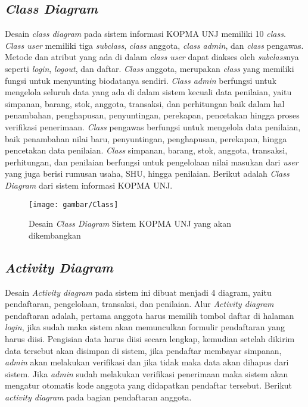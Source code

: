 \subsection{\emph{Class Diagram}}
Desain \emph{class diagram} pada sistem informasi KOPMA UNJ memiliki 10 \emph{class}. \emph{Class user} memiliki tiga \emph{subclass}, \emph{class} anggota, \emph{class admin}, dan \emph{class} pengawas. Metode dan atribut yang ada di dalam \emph{class user} dapat diakses oleh \emph{subclass}nya seperti \emph{login}, \emph{logout}, dan daftar. \emph{Class} anggota, merupakan \emph{class} yang memiliki fungsi untuk menyunting biodatanya sendiri. \emph{Class admin} berfungsi untuk mengelola seluruh data yang ada di dalam sistem kecuali data penilaian, yaitu simpanan, barang, stok, anggota, transaksi, dan perhitungan baik dalam hal penambahan, penghapusan, penyuntingan, perekapan, pencetakan hingga proses verifikasi penerimaan. \emph{Class} pengawas berfungsi untuk mengelola data penilaian, baik penambahan nilai baru, penyuntingan, penghapusan, perekapan, hingga pencetakan data penilaian. \emph{Class} simpanan, barang, stok, anggota, transaksi, perhitungan, dan penilaian berfungsi untuk pengelolaan nilai masukan dari \emph{user} yang juga berisi rumusan usaha, SHU, hingga penilaian. Berikut adalah \emph{Class Diagram} dari sistem informasi KOPMA UNJ. 

\begin{figure}[H]
	\centering
	\texttt{[image: gambar/Class]}
	\caption{Desain \emph{Class Diagram} Sistem KOPMA UNJ yang akan dikembangkan}
\end{figure}

\subsection{\emph{Activity Diagram}}
Desain \emph{Activity diagram} pada sistem ini dibuat menjadi 4 diagram, yaitu pendaftaran, pengelolaan, transaksi, dan penilaian. Alur \emph{Activity diagram} pendaftaran adalah, pertama anggota harus memilih tombol daftar di halaman \emph{login}, jika sudah maka sistem akan memunculkan formulir pendaftaran yang harus diisi. Pengisian data harus diisi secara lengkap, kemudian setelah dikirim data tersebut akan disimpan di sistem, jika pendaftar membayar simpanan, \emph{admin} akan melakukan verifikasi dan jika tidak maka data akan dihapus dari sistem. Jika \textit{admin} sudah melakukan verifikasi penerimaan maka sistem akan mengatur otomatis kode anggota yang didapatkan pendaftar tersebut. Berikut \textit{activity diagram} pada bagian pendaftaran anggota.

